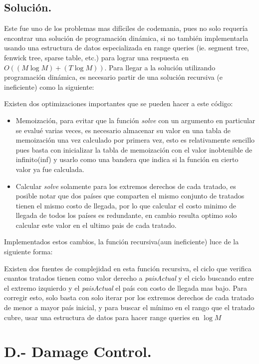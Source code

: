 \documentclass[12pt,letterpaper,titlepage]{article}
\begin{document}
\subsection{Solución.}
	Este fue uno de los problemas mas difíciles de codemania, pues no solo requería encontrar una solución de programación dinámica, si no también implementarla usando una estructura de datos especializada en range queries (ie. segment tree, fenwick tree, sparse table, etc.) para lograr una respuesta en $O((M \log M)+(T \log M))$. Para llegar a la solución utilizando programación dinámica, es necesario partir de una solución recursiva (e ineficiente) como la siguiente:
	
	Existen dos optimizaciones importantes que se pueden hacer a este código:
	\begin{itemize}
		\item Memoización, para evitar que la función \textit{solve} con un  argumento en particular se evalué varias veces, es necesario almacenar su valor en una tabla de memoización una vez calculado por primera vez, esto es relativamente sencillo pues basta con inicializar la tabla de memoización con el valor inobtenible de infinito(inf) y usarlo como una bandera que indica si la función en cierto valor ya fue calculada.
		\item  Calcular \textit{solve} solamente para los extremos derechos de cada tratado, es posible notar que dos países que comparten el mismo conjunto de tratados tienen el mismo costo de llegada, por lo que calcular el costo minimo de llegada de todos los países es redundante, en cambio resulta optimo solo calcular este valor en el ultimo pais de cada tratado.
	\end{itemize}
	Implementados estos cambios, la función recursiva(aun ineficiente) luce de la siguiente forma:
	
	Existen dos fuentes de complejidad en esta función recursiva, el ciclo que verifica cuantos tratados tienen como valor derecho a \textit{paisActual} y el ciclo buscando entre el extremo izquierdo y el \textit{paisActual} el país con costo de llegada mas bajo. Para corregir esto, solo basta con solo iterar por los extremos derechos de cada tratado de menor a mayor país inicial, y para buscar el mínimo en el rango que el tratado cubre, usar una estructura de datos para hacer range queries en $\log M$
	
\clearpage\section{D.- Damage Control.}
\end{document}
